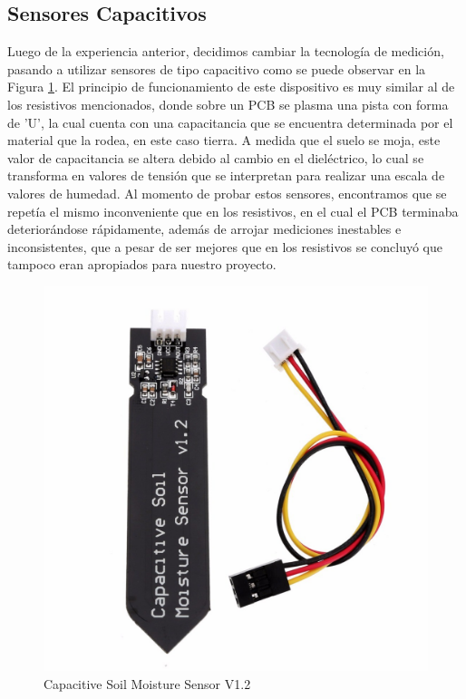 \documentclass{article}
\begin{document}
\subsection{Sensores Capacitivos}
Luego de la experiencia anterior, decidimos cambiar la tecnología de medición, pasando a utilizar sensores de tipo capacitivo como se puede observar en la Figura \ref{fig:sensor_capacitivo}. El principio de funcionamiento de este dispositivo es muy similar al de los resistivos mencionados, donde sobre un PCB se plasma una pista con forma de 'U', la cual cuenta con una capacitancia que se encuentra determinada por el material que la rodea, en este caso tierra. A medida que el suelo se moja, este valor de capacitancia se altera debido al cambio en el dieléctrico, lo cual se transforma en valores de tensión que se interpretan para realizar una escala de valores de humedad. 
Al momento de probar estos sensores, encontramos que se repetía el mismo inconveniente que en los resistivos, en el cual el PCB terminaba deteriorándose rápidamente, además de arrojar mediciones inestables e inconsistentes, que a pesar de ser mejores que en los resistivos se concluyó que tampoco eran apropiados para nuestro proyecto.

\begin{figure}[H]
    \centering
    \includegraphics[scale=0.15]{Imagenes/capa1.jpg}
    \caption{Capacitive Soil Moisture Sensor V1.2}
    \label{fig:sensor_capacitivo}
\end{figure}
\end{document}
